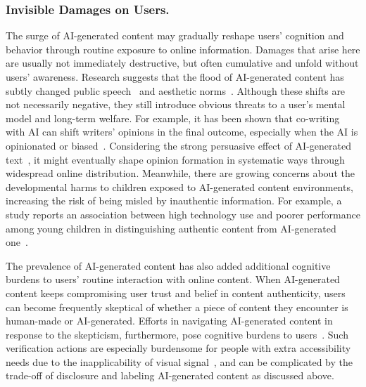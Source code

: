 \subsubsection{Invisible Damages on Users.}
\label{subsubsec:invisibledamage}
The surge of AI-generated content may gradually reshape users’ cognition and behavior through routine exposure to online information. Damages that arise here are usually not immediately destructive, but often cumulative and unfold without users’ awareness. Research suggests that the flood of AI-generated content has subtly changed public speech~\cite{Gross2025AISlopAP,chen2025synthetic} and aesthetic norms~\cite{Gross2025AISlopAP, kommers2026ai}. Although these shifts are not necessarily negative, they still introduce obvious threats to a user's mental model and long-term welfare. For example, it has been shown that co-writing with AI can shift writers' opinions in the final outcome, especially when the AI is opinionated or biased~\cite{jakesch2023co,shahid2025examining}. Considering the strong persuasive effect of AI-generated text~\cite{bai2025llm, salvi2025conversational}, it might eventually shape opinion formation in systematic ways through widespread online distribution. Meanwhile, there are growing concerns about the developmental harms to children exposed to AI-generated content environments, increasing the risk of being misled by inauthentic information. For example, a study reports an association between high technology use and poorer performance among young children in distinguishing authentic content from AI-generated one~\cite{langer5678206children}.

The prevalence of AI-generated content has also added additional cognitive burdens to users' routine interaction with online content. When AI-generated content keeps compromising user trust and belief in content authenticity, users can become frequently skeptical of whether a piece of content they encounter is human-made or AI-generated. Efforts in navigating AI-generated content in response to the skepticism, furthermore, pose cognitive burdens to users~\cite{eissa2025influence}. Such verification actions are especially burdensome for people with extra accessibility needs due to the inapplicability of visual signal~\cite{ide2025signals}, and can be complicated by the trade-off of disclosure and labeling AI-generated content as discussed above. 

